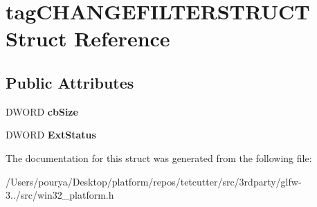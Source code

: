 \hypertarget{structtagCHANGEFILTERSTRUCT}{}\section{tag\+C\+H\+A\+N\+G\+E\+F\+I\+L\+T\+E\+R\+S\+T\+R\+U\+C\+T Struct Reference}
\label{structtagCHANGEFILTERSTRUCT}
\subsection*{Public Attributes}
\begin{DoxyCompactItemize}
\item 
\hypertarget{structtagCHANGEFILTERSTRUCT_a2d2a9cadf217fafa2dd2885a62503232}{}D\+W\+O\+R\+D {\bfseries cb\+Size}\label{structtagCHANGEFILTERSTRUCT_a2d2a9cadf217fafa2dd2885a62503232}

\item 
\hypertarget{structtagCHANGEFILTERSTRUCT_ab8457ed2f0df3870329266ea5425a7f8}{}D\+W\+O\+R\+D {\bfseries Ext\+Status}\label{structtagCHANGEFILTERSTRUCT_ab8457ed2f0df3870329266ea5425a7f8}

\end{DoxyCompactItemize}


The documentation for this struct was generated from the following file\+:\begin{DoxyCompactItemize}
\item 
/\+Users/pourya/\+Desktop/platform/repos/tetcutter/src/3rdparty/glfw-\/3../src/win32\+\_\+platform.\+h\end{DoxyCompactItemize}
